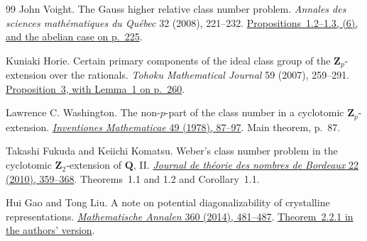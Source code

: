 \begin{thebibliography}{99}
John Voight. The Gauss higher relative class number problem.
\emph{Annales des sciences math\'ematiques du Qu\'ebec} 32 (2008), 221--232.
\href{https://www.labmath.uqam.ca/~annales/volumes/32-2/PDF/221-232.pdf\#page=4}
{Propositions~1.2--1.3, (6), and the abelian case on p.~225}.

Kuniaki Horie. Certain primary components of the ideal class group
of the \(\mathbf Z_p\)-extension over the rationals.
\emph{Tohoku Mathematical Journal} 59 (2007), 259--291.
\href{https://www.jstage.jst.go.jp/article/tmj/59/2/59_2_259/_pdf/-char/en\#page=31}
{Proposition~3, with Lemma~1 on p.~260}.

Lawrence C. Washington. The non-\(p\)-part of the class number in a
cyclotomic \(\mathbf Z_p\)-extension.
\href{https://doi.org/10.1007/BF01399512}
{\emph{Inventiones Mathematicae} 49 (1978), 87--97}. Main theorem, p.~87.

Takashi Fukuda and Keiichi Komatsu. Weber's class number problem in
the cyclotomic \(\mathbf Z_2\)-extension of \(\mathbf Q\), II.
\href{https://doi.org/10.5802/jtnb.720}
{\emph{Journal de th\'eorie des nombres de Bordeaux} 22 (2010), 359--368}.
Theorems~1.1 and 1.2 and Corollary~1.1.

Hui Gao and Tong Liu. A note on potential diagonalizability of
crystalline representations.
\href{https://doi.org/10.1007/s00208-014-1041-7}
{\emph{Mathematische Annalen} 360 (2014), 481--487}.
\href{https://www.math.purdue.edu/~tongliu/pub/PDp-1.pdf\#page=3}
{Theorem~2.2.1 in the authors' version}.

\end{thebibliography}
\endgroup
